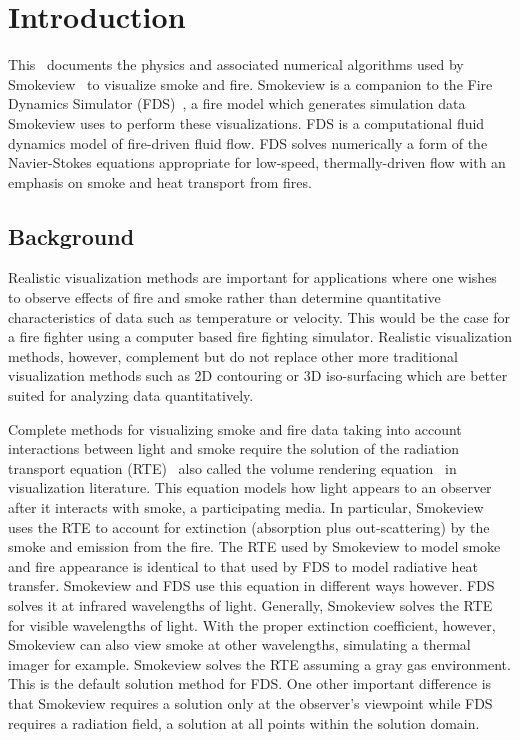 

\section{Introduction}
This \paper\ documents the physics and associated numerical algorithms used by Smokeview~\cite{Smokeview_Users_Guide} to visualize smoke and fire.  Smokeview is a companion to the Fire Dynamics Simulator (FDS)~\cite{FDS_Math_Guide}, a fire model which generates   simulation data Smokeview uses to perform these visualizations. FDS is a computational fluid dynamics model of fire-driven fluid flow. FDS solves numerically a form of the Navier-Stokes equations appropriate for low-speed, thermally-driven flow with an emphasis on smoke and heat transport from fires.


\subsection{Background}

Realistic visualization methods are important for applications where one wishes to observe effects of fire and smoke rather than determine quantitative characteristics of data such as temperature or velocity.  This would be the case for a fire fighter using a computer based fire fighting simulator. Realistic visualization methods, however, complement but do not replace other more traditional visualization methods such as 2D contouring or 3D iso-surfacing which are better suited for analyzing data quantitatively.

Complete methods for visualizing smoke and fire data taking into account interactions between light and smoke require the solution of the radiation transport equation (RTE)~\cite{Siegel:2001} also called the volume rendering equation~\cite{levoy:1988} in visualization literature. This equation models how light appears to an observer after it interacts with smoke, a participating media. In particular, Smokeview uses the RTE to account for extinction (absorption plus out-scattering) by the smoke and emission from the fire.  The RTE used by Smokeview to model smoke and fire appearance is identical to that used by FDS to model radiative heat transfer.  Smokeview and FDS use this equation in different ways however.  FDS solves it at infrared wavelengths of light.  Generally, Smokeview solves the RTE for visible wavelengths of light.  With the proper extinction coefficient, however, Smokeview can also view smoke at other wavelengths, simulating a thermal imager for example. Smokeview solves the RTE assuming a gray gas environment.  This is the default solution method for FDS.  One other important difference is that Smokeview requires a solution only at the observer's viewpoint while FDS requires a radiation field, a solution at all points within the solution domain.

